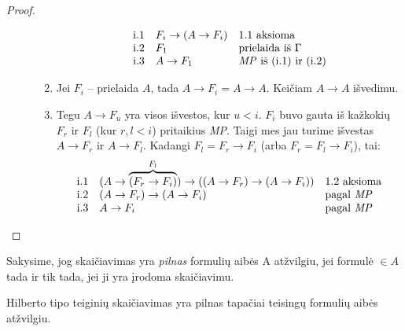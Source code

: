 \begin{prop}
\begin{proof}
\begin{description}
\begin{enumerate}
          \[
          \begin{array}{l l l}
            \text{i.1} & F_{i} \to (A \to F_{i}) & \text{1.1 aksioma} \\
            \text{i.2} & F_{1} & \text{prielaida iš } \Gamma\\
            \text{i.3} & A \to F_{1} & \text{\emph{MP} iš (i.1) ir (i.2)}\\
          \end{array}
          \]
        \item Jei $F_{i}$ – prielaida $A$, tada 
          $A \to F_{i} = A \to A$. Keičiam $A \to A$ išvedimu.
        \item Tegu $A \to F_{u}$ yra visos išvestos, kur $u < i$.
          $F_{i}$ buvo gauta iš kažkokių $F_{r}$ ir $F_{l}$ (kur
          $r,l < i$) pritaikius \emph{MP}. Taigi mes jau turime išvestas
          $A \to F_{r}$ ir $A \to F_{l}$. Kadangi $F_{l} = F_{r} \to F_{i}$
          (arba $F_{r} = F_{l} \to F_{i}$), tai:
          \[
          \begin{array}{l l l}
            \text{i.1} & (A \to \overbrace{(F_{r} \to F_{i})}^{F_{l}})%
              \to ((A \to F_{r}) \to (A \to F_{i})) &%
              \text{1.2 aksioma} \\
            \text{i.2} & (A \to F_{r}) \to (A \to F_{i}) &%
              \text{pagal \emph{MP}} \\
            \text{i.3} & A \to F_{i} & \text{pagal \emph{MP}}
          \end{array}
          \]
      \end{enumerate}
      
    \end{description}
  \end{proof}
\end{prop}

Sakysime, jog skaičiavimas yra \emph{pilnas} formulių aibės A atžvilgiu,
jei formulė $\in A$ tada ir tik tada, jei ji yra įrodoma skaičiavimu.

Hilberto tipo teiginių skaičiavimas yra pilnas tapačiai teisingų formulių
aibės atžvilgiu.
